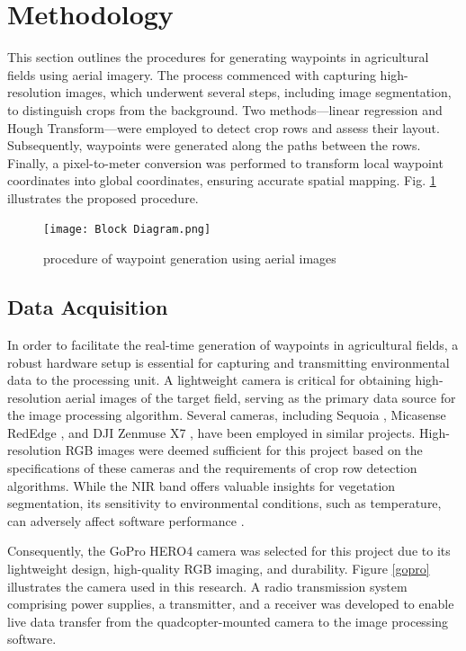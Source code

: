 \documentclass[conference]{IEEEtran}
\begin{document}
	\section{Methodology}
	
	This section outlines the procedures for generating waypoints in agricultural fields using aerial imagery. The process commenced with capturing high-resolution images, which underwent several steps, including image segmentation, to distinguish crops from the background. Two methods—linear regression and Hough Transform—were employed to detect crop rows and assess their layout. Subsequently, waypoints were generated along the paths between the rows. Finally, a pixel-to-meter conversion was performed to transform local waypoint coordinates into global coordinates, ensuring accurate spatial mapping. Fig. \ref{fig_procedure} illustrates the proposed procedure.
	
	
	\begin{figure}[t]
		\texttt{[image: Block Diagram.png]}
		\caption{procedure of waypoint generation using aerial images
			\cite{b5}}
		\label{fig_procedure}
	\end{figure}
	
	\subsection{Data Acquisition}\label{Data Acquisition}
	In order to facilitate the real-time generation of waypoints in agricultural fields, a robust hardware setup is essential for capturing and transmitting environmental data to the processing unit. A lightweight camera is critical for obtaining high-resolution aerial images of the target field, serving as the primary data source for the image processing algorithm. Several cameras, including Sequoia \cite{b9,b4,b7,b6}, Micasense RedEdge \cite{b9,b14}, and DJI Zenmuse X7 \cite{b5}, have been employed in similar projects. High-resolution RGB images were deemed sufficient for this project based on the specifications of these cameras and the requirements of crop row detection algorithms. While the NIR band offers valuable insights for vegetation segmentation, its sensitivity to environmental conditions, such as temperature, can adversely affect software performance \cite{b5}. 
	
	Consequently, the GoPro HERO4 camera was selected for this project due to its lightweight design, high-quality RGB imaging, and durability. Figure \ref{gopro} illustrates the camera used in this research. A radio transmission system comprising power supplies, a transmitter, and a receiver was developed to enable live data transfer from the quadcopter-mounted camera to the image processing software. 
	
\end{document}
